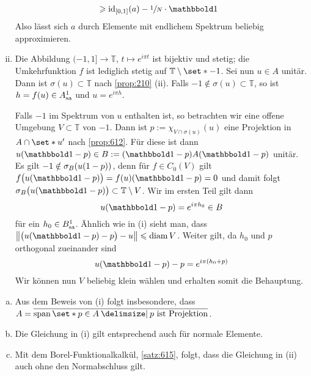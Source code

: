 \begin{beweis}
\begin{enumerate}[(i)]
\begin{align}
			&\ge \id_{[0,1]}(a) - \sfrac{1}{N} \cdot \ind 
		\end{align}
		Also lässt sich $a$ durch Elemente mit endlichem Spektrum beliebig approximieren.
		\item Die Abbildung $(-1,1] \to \mathbb{T}$, $t \mapsto e^{i \pi t}$ ist bijektiv und stetig; die Umkehrfunktion $f$ ist lediglich stetig auf $\mathbb{T} \setminus \set*{-1}$.
		Sei nun $u \in A$ unitär. 
		Dann ist $\sigma(u) \subset \mathbb{T}$ nach \autoref{prop:210} (ii).
		Falls $-1 \notin \sigma(u) \subset \mathbb{T}$, so ist $h=f(u) \in A_{\mathrm{sa}}^1$ und $u=e^{i \pi h}$.
		
		Falls $-1$ im Spektrum von $u$ enthalten ist, so betrachten wir eine offene Umgebung $V \subset \mathbb{T}$ von $-1$.
		Dann ist $p:= \chi_{V\cap \sigma(u)}(u)$ eine Projektion in $A \cap \set*{u}'$ nach \autoref{prop:612}.
		Für diese ist dann $u(\ind-p) \in B := (\ind-p)A(\ind-p)$ unitär.
		Es gilt $-1 \notin \sigma_B \enbrace*{u(1-p)}$, denn für $f \in C_0(V)$ gilt $f \enbrace[\big]{u(\ind-p)}= f(u)(\ind-p)=0$ und damit folgt $\sigma_B \enbrace[\big]{u(\ind-p)} \subset \mathbb{T}\setminus V$.
		Wir im ersten Teil gilt dann
		\[
			u(\ind-p)= e^{i \pi h_0} \in B
		\]
		für ein $h_0 \in B_{\mathrm{sa}}^1$. 
		Ähnlich wie in (i) sieht man, dass 
		\(
			\norm*{\enbrace[\big]{u(\ind-p) -p} -u} \le \diam V
		\).
		Weiter gilt, da $h_0$ und $p$ orthogonal zueinander sind
		\[
			u(\ind-p) - p = e^{i \pi(h_0+p)} 
		\]
		Wir können nun $V$ beliebig klein wählen und erhalten somit die Behauptung.\qedhere
	\end{enumerate}
\end{beweis}

\begin{bemerkung}[{name=[Folgerungen aus \autoref{korr:613}]},label=bem:614]
	\leavevmode
	\begin{enumerate}[a),itemsep=0pt]
		\item Aus dem Beweis von (i) folgt insbesondere, dass $A= \overline{\Span \set*{p \in A \given p\text{ ist Projektion}}}$.
		\item Die Gleichung in (i) gilt entsprechend auch für normale Elemente.
		\item Mit dem Borel-Funktionalkalkül, \autoref{satz:615}, folgt, dass die Gleichung in (ii) auch ohne den Normabschluss gilt.
	\end{enumerate}
\end{bemerkung}

